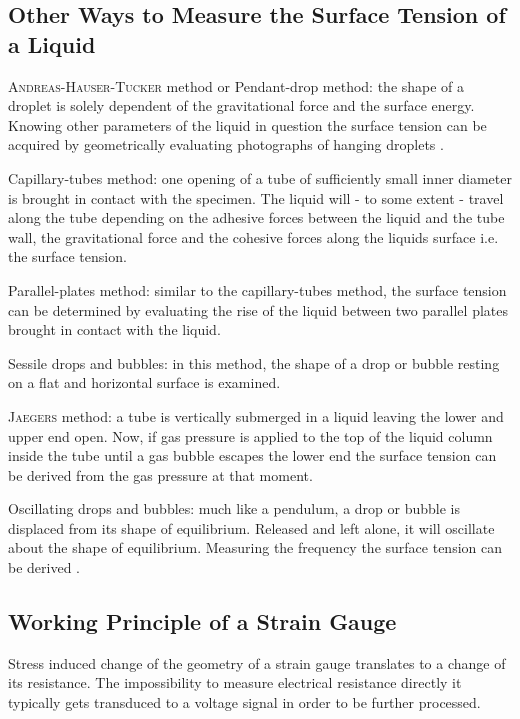         \subsection*{Other Ways to Measure the Surface Tension of a Liquid}
            \textsc{Andreas-Hauser-Tucker} method or Pendant-drop method: the shape of a droplet is solely dependent of the
            gravitational force and the surface energy. Knowing other parameters of the liquid in question the surface tension
            can be acquired by geometrically evaluating photographs of hanging droplets \cite{Andreas-Hauser-Tucker.surface.tension.pendant.drop.1938}.\par
            Capillary-tubes method: one opening of a tube of sufficiently small inner diameter is brought in contact with
            the specimen. The liquid will - to some extent - travel along the tube depending on the adhesive forces between
            the liquid and the tube wall, the gravitational force and the cohesive forces along the liquids surface i.e.
            the surface tension.\par
            Parallel-plates method: similar to the capillary-tubes method, the surface tension can be determined by evaluating
            the rise of the liquid between two parallel plates brought in contact with the liquid.\par
            Sessile drops and bubbles: in this method, the shape of a drop or bubble resting on a flat and horizontal surface
            is examined.\par
            \textsc{Jaegers} method: a tube is vertically submerged in a liquid leaving the lower and upper end open. Now,
            if gas pressure is applied to the top of the liquid column inside the tube until a gas bubble escapes the lower
            end the surface tension can be derived from the gas pressure at that moment.\par
            Oscillating drops and bubbles: much like a pendulum, a drop or bubble is displaced from its shape of equilibrium.
            Released and left alone, it will oscillate about the shape of equilibrium. Measuring the frequency the surface
            tension can be derived \cite{oscillating.drops.surface.tension.Freer.2005}.
        \subsection*{Working Principle of a Strain Gauge}
            Stress induced change of the geometry of a strain gauge translates to a change of its resistance. The impossibility
            to measure electrical resistance directly it typically gets transduced to a voltage signal in order to be further
            processed.

